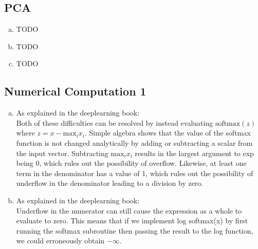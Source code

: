 \documentclass[12pt]{article}
\begin{document}

\setcounter{section}{2}

\subsection{PCA}
\begin{enumerate}[a)]
    \item 
        TODO
    \item
        TODO
    \item
        TODO
\end{enumerate}


\subsection{Numerical Computation 1}

\begin{enumerate}[a)]
    \item 
        As explained in the deeplearning book:\\
        Both of these difficulties can be resolved by instead evaluating $\text{softmax}(z)$ where $z = x - \text{max}_i x_i$. Simple algebra shows that the value of the softmax function is not changed analytically by adding or subtracting a scalar from the input vector. Subtracting $\text{max}_i x_i$ results in the largest argument to exp being 0, which rules out the possibility of overflow. Likewise, at least one term in the denominator has a value of 1, which rules out the possibility of underflow in the denominator leading to a division by zero.
    \item
        As explained in the deeplearning book:\\
        Underflow in the numerator can still cause the expression as a whole to evaluate to zero. This means that if we implement log softmax(x) by first running the softmax subroutine then passing the result to the log function, we could erroneously obtain $-\infty$.
\end{enumerate}
\end{document}

